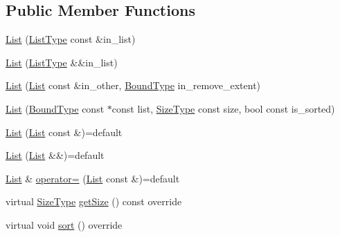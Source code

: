 \subsection*{Public Member Functions}
\begin{DoxyCompactItemize}
\item 
\hyperlink{structvt_1_1group_1_1region_1_1_list_a1c670c1ead337cb8abceecf810e629ca}{List} (\hyperlink{structvt_1_1group_1_1region_1_1_region_a4e35b2fc6dca06aca0b7bc0e19b35c5a}{List\+Type} const \&in\+\_\+list)
\item 
\hyperlink{structvt_1_1group_1_1region_1_1_list_ad065a462795289684b4bce819702c99d}{List} (\hyperlink{structvt_1_1group_1_1region_1_1_region_a4e35b2fc6dca06aca0b7bc0e19b35c5a}{List\+Type} \&\&in\+\_\+list)
\item 
\hyperlink{structvt_1_1group_1_1region_1_1_list_acf3b9e946b2aa160985a65aa15288b82}{List} (\hyperlink{structvt_1_1group_1_1region_1_1_list}{List} const \&in\+\_\+other, \hyperlink{structvt_1_1group_1_1region_1_1_region_abf426ff85bed72c1c6524fad6a9f1751}{Bound\+Type} in\+\_\+remove\+\_\+extent)
\item 
\hyperlink{structvt_1_1group_1_1region_1_1_list_ab5c517417a49f428c8211e70043d2b3b}{List} (\hyperlink{structvt_1_1group_1_1region_1_1_region_abf426ff85bed72c1c6524fad6a9f1751}{Bound\+Type} const $\ast$const list, \hyperlink{structvt_1_1group_1_1region_1_1_region_a9bb381adf31111aae34dbc644bad6c1f}{Size\+Type} const size, bool const is\+\_\+sorted)
\item 
\hyperlink{structvt_1_1group_1_1region_1_1_list_a4f5cfc858b58c690a24f10621351e904}{List} (\hyperlink{structvt_1_1group_1_1region_1_1_list}{List} const \&)=default
\item 
\hyperlink{structvt_1_1group_1_1region_1_1_list_a832f5f93b9542d7a961d0398e1f6cf10}{List} (\hyperlink{structvt_1_1group_1_1region_1_1_list}{List} \&\&)=default
\item 
\hyperlink{structvt_1_1group_1_1region_1_1_list}{List} \& \hyperlink{structvt_1_1group_1_1region_1_1_list_a60aabaef773693847cb82501bfe8d0ad}{operator=} (\hyperlink{structvt_1_1group_1_1region_1_1_list}{List} const \&)=default
\item 
virtual \hyperlink{structvt_1_1group_1_1region_1_1_region_a9bb381adf31111aae34dbc644bad6c1f}{Size\+Type} \hyperlink{structvt_1_1group_1_1region_1_1_list_a9a74188a75483097c41253616527ac46}{get\+Size} () const override
\item 
virtual void \hyperlink{structvt_1_1group_1_1region_1_1_list_acebca171776662bdf481ed1eb7ee4c09}{sort} () override

\end{DoxyCompactItemize}
